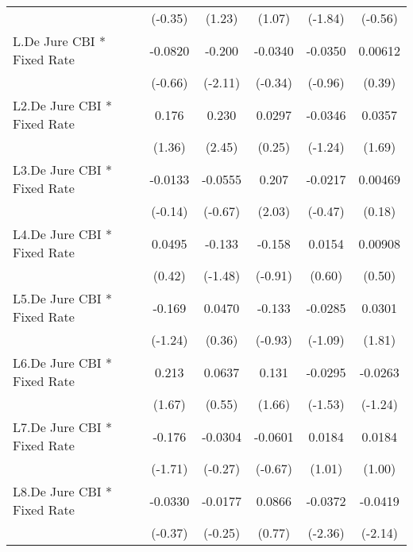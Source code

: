 {\begin{longtable}{l*{5}{c}}
                &  (-0.35)         &   (1.23)         &   (1.07)         &  (-1.84)         &  (-0.56)         \\
[1em]
L.De Jure CBI * Fixed Rate&  -0.0820         &   -0.200\sym{*}  &  -0.0340         &  -0.0350         &  0.00612         \\
                &  (-0.66)         &  (-2.11)         &  (-0.34)         &  (-0.96)         &   (0.39)         \\
[1em]
L2.De Jure CBI * Fixed Rate&    0.176         &    0.230\sym{*}  &   0.0297         &  -0.0346         &   0.0357         \\
                &   (1.36)         &   (2.45)         &   (0.25)         &  (-1.24)         &   (1.69)         \\
[1em]
L3.De Jure CBI * Fixed Rate&  -0.0133         &  -0.0555         &    0.207\sym{*}  &  -0.0217         &  0.00469         \\
                &  (-0.14)         &  (-0.67)         &   (2.03)         &  (-0.47)         &   (0.18)         \\
[1em]
L4.De Jure CBI * Fixed Rate&   0.0495         &   -0.133         &   -0.158         &   0.0154         &  0.00908         \\
                &   (0.42)         &  (-1.48)         &  (-0.91)         &   (0.60)         &   (0.50)         \\
[1em]
L5.De Jure CBI * Fixed Rate&   -0.169         &   0.0470         &   -0.133         &  -0.0285         &   0.0301         \\
                &  (-1.24)         &   (0.36)         &  (-0.93)         &  (-1.09)         &   (1.81)         \\
[1em]
L6.De Jure CBI * Fixed Rate&    0.213         &   0.0637         &    0.131         &  -0.0295         &  -0.0263         \\
                &   (1.67)         &   (0.55)         &   (1.66)         &  (-1.53)         &  (-1.24)         \\
[1em]
L7.De Jure CBI * Fixed Rate&   -0.176         &  -0.0304         &  -0.0601         &   0.0184         &   0.0184         \\
                &  (-1.71)         &  (-0.27)         &  (-0.67)         &   (1.01)         &   (1.00)         \\
[1em]
L8.De Jure CBI * Fixed Rate&  -0.0330         &  -0.0177         &   0.0866         &  -0.0372\sym{*}  &  -0.0419\sym{*}  \\
                &  (-0.37)         &  (-0.25)         &   (0.77)         &  (-2.36)         &  (-2.14)         \\

\end{longtable}}
